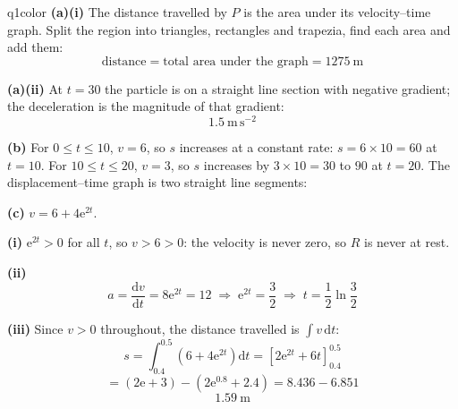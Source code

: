 \documentclass[11pt,a4paper]{article}
\begin{document}
\begin{ansbox}{q1color}
\textbf{(a)(i)} The distance travelled by $P$ is the area under its velocity--time graph. Split the region into triangles, rectangles and trapezia, find each area and add them:
\[ \text{distance}=\text{total area under the graph}=\boxed{1275\ \mathrm{m}} \]

\textbf{(a)(ii)} At $t=30$ the particle is on a straight line section with negative gradient; the deceleration is the magnitude of that gradient:
\[ \boxed{1.5\ \mathrm{m\,s^{-2}}} \]

\textbf{(b)} For $0\leqslant t\leqslant 10$, $v=6$, so $s$ increases at a constant rate: $s=6\times 10=60$ at $t=10$. For $10\leqslant t\leqslant 20$, $v=3$, so $s$ increases by $3\times 10=30$ to $90$ at $t=20$. The displacement--time graph is two straight line segments:

\begin{center}
\end{center}

\textbf{(c)} $v=6+4\mathrm{e}^{2t}$.

\textbf{(i)} $\mathrm{e}^{2t}>0$ for all $t$, so $v>6>0$: the velocity is never zero, so $R$ is never at rest.

\textbf{(ii)}
\[ a=\frac{\mathrm{d}v}{\mathrm{d}t}=8\mathrm{e}^{2t}=12 \;\Rightarrow\; \mathrm{e}^{2t}=\frac{3}{2} \;\Rightarrow\; \boxed{t=\frac{1}{2}\ln\frac{3}{2}} \]

\textbf{(iii)} Since $v>0$ throughout, the distance travelled is $\int v\,\mathrm{d}t$:
\[ s=\int_{0.4}^{0.5}\left(6+4\mathrm{e}^{2t}\right)\mathrm{d}t=\left[2\mathrm{e}^{2t}+6t\right]_{0.4}^{0.5} \]
\[ =\left(2\mathrm{e}+3\right)-\left(2\mathrm{e}^{0.8}+2.4\right)=8.436-6.851 \]
\[ \boxed{1.59\ \mathrm{m}} \]
\end{ansbox}
\end{document}
